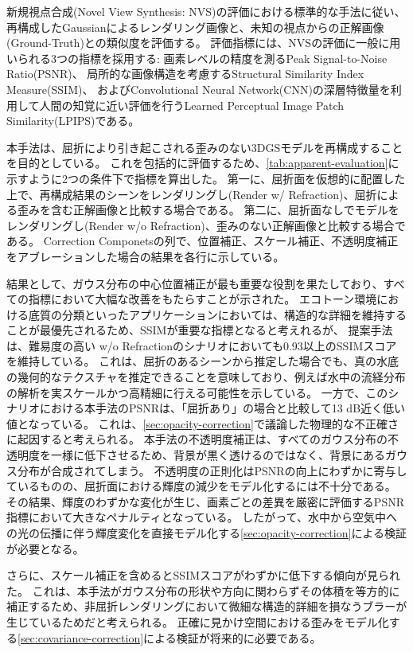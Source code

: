 新規視点合成(Novel View Synthesis: NVS)の評価における標準的な手法に従い、再構成したGaussianによるレンダリング画像と、未知の視点からの正解画像(Ground-Truth)との類似度を評価する。
評価指標には、NVSの評価に一般に用いられる3つの指標を採用する:
画素レベルの精度を測るPeak Signal-to-Noise Ratio(PSNR)、
局所的な画像構造を考慮するStructural Similarity Index Measure(SSIM)\parencite{Zhou2004_SSIM}、
およびConvolutional Neural Network(CNN)の深層特徴量を利用して人間の知覚に近い評価を行うLearned Perceptual Image Patch Similarity(LPIPS)\parencite{Zhang2018CVPR_LPIPS}である。

本手法は、屈折により引き起こされる歪みのない3DGSモデルを再構成することを目的としている。
これを包括的に評価するため、\cref{tab:apparent-evaluation}に示すように2つの条件下で指標を算出した。
第一に、屈折面を仮想的に配置した上で、再構成結果のシーンをレンダリングし(Render w/ Refraction)、屈折による歪みを含む正解画像と比較する場合である。
第二に、屈折面なしでモデルをレンダリングし(Render w/o Refraction)、歪みのない正解画像と比較する場合である。
Correction Componetsの列で、位置補正、スケール補正、不透明度補正をアブレーションした場合の結果を各行に示している。

結果として、ガウス分布の中心位置補正が最も重要な役割を果たしており、すべての指標において大幅な改善をもたらすことが示された。
エコトーン環境における底質の分類といったアプリケーションにおいては、構造的な詳細を維持することが最優先されるため、SSIMが重要な指標となると考えれるが、
提案手法は、難易度の高い w/o Refractionのシナリオにおいても0.93以上のSSIMスコアを維持している。
これは、屈折のあるシーンから推定した場合でも、真の水底の幾何的なテクスチャを推定できることを意味しており、例えば水中の流経分布の解析を実スケールかつ高精細に行える可能性を示している。
一方で、このシナリオにおける本手法のPSNRは、「屈折あり」の場合と比較して13 dB近く低い値となっている。
これは、\cref{sec:opacity-correction}で議論した物理的な不正確さに起因すると考えられる。
本手法の不透明度補正は、すべてのガウス分布の不透明度を一様に低下させるため、背景が黒く透けるのではなく、背景にあるガウス分布が合成されてしまう。
不透明度の正則化はPSNRの向上にわずかに寄与しているものの、屈折面における輝度の減少をモデル化するには不十分である。
その結果、輝度のわずかな変化が生じ、画素ごとの差異を厳密に評価するPSNR指標において大きなペナルティとなっている。
したがって、水中から空気中への光の伝播に伴う輝度変化を直接モデル化する\cref{sec:opacity-correction}による検証が必要となる。

さらに、スケール補正を含めるとSSIMスコアがわずかに低下する傾向が見られた。
これは、本手法がガウス分布の形状や方向に関わらずその体積を等方的に補正するため、非屈折レンダリングにおいて微細な構造的詳細を損なうブラーが生じているためだと考えられる。
正確に見かけ空間における歪みをモデル化する\cref{sec:covariance-correction}による検証が将来的に必要である。

